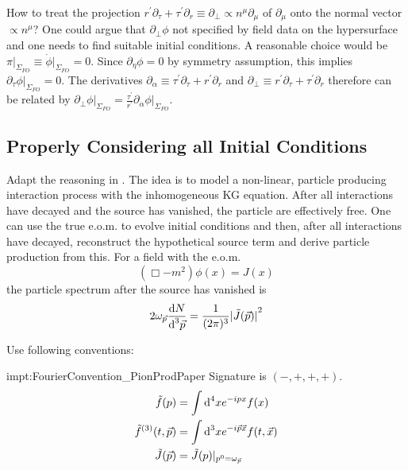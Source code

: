 How to treat the projection $r^\prime\partial_\tau+\tau^\prime\partial_r\equiv\partial_\perp\propto n^\mu\partial_\mu$ of $\partial_\mu$ onto the normal vector $\propto n^\mu$? One could argue that $\partial_\perp\phi$ not specified by field data on the hypersurface and one needs to find suitable initial conditions. A reasonable choice would be $\pi\vert_{\Sigma_{FO}}\equiv\dot{\phi}\vert_{\Sigma_{FO}}=0$. Since $\partial_\eta\phi=0$ by symmetry assumption, this implies $\partial_\tau\phi\vert_{\Sigma_{FO}}=0$. The derivatives $\partial_\alpha\equiv\tau^\prime\partial_\tau+r^\prime\partial_r$ and $\partial_\perp\equiv r^\prime\partial_\tau+\tau^\prime\partial_r$ therefore can be related by $\partial_\perp\phi\vert_{\Sigma_{FO}}=\frac{\tau^\prime}{r^\prime}\partial_\alpha\phi\vert_{\Sigma_{FO}}$.

\subsection{Properly Considering all Initial Conditions}

Adapt the reasoning in \cite{Amelino-CameliaEtAl_1997}. The idea is to model a non-linear, particle producing interaction process with the inhomogeneous KG equation. After all interactions have decayed and the source has vanished, the particle are effectively free. One can use the true e.o.m. to evolve initial conditions and then, after all interactions have decayed, reconstruct the hypothetical source term and derive particle production from this. For a field with the e.o.m.
\begin{equation}
    (\Box-m^2)\phi(x)=J(x)
\end{equation}
the particle spectrum after the source has vanished is
\begin{equation}
    2\omega_{\vec{p}}\frac{\text{d} N}{\text{d}^3\vec{p}}=\frac{1}{(2\pi)^3}{\vert\tilde{J}(\vec{p})\vert}^2
\end{equation}

Use following conventions:
\begin{impt}{impt:FourierConvention_PionProdPaper}
    Signature is $(-,+,+,+)$.
    \begin{subequations}
        \begin{align}
            \tilde{f}(p)               & =\int\text{d}^4x e^{-{i} px}f(x)                     \\
            \tilde{f}^{(3)}(t,\vec{p}) & =\int\text{d}^3xe^{-{i}\vec{p}{\vec{x}}}f(t,\vec{x}) \\
            \tilde{J}(\vec{p})         & =\tilde{J}(p)\vert_{p^0=\omega_{\vec{p}}}
        \end{align}
    \end{subequations}
\end{impt}

